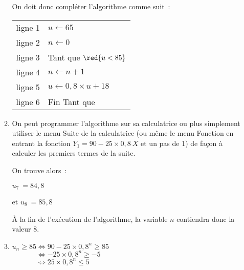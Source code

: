 \begin{corrige}
\begin{enumerate}
\begin{enumerate}[label=\alph*.]
               On doit donc compléter l'algorithme comme suit~:
               \begin{center}
                    \begin{extern}%
                         \begin{tabularx}{0.5\linewidth}{|c|X|}\hline
                              ligne 1&$u \gets 65$\\
                              ligne 2&$n \gets 0$\\
                              ligne 3&Tant que  $\red{u<85}$\\
                              ligne 4&\hspace{1cm}$n \gets n+1$\\
                              ligne 5&\hspace{1cm}$u \gets 0,8 \times u + 18$\\
                              ligne 6&Fin Tant que\\ \hline
                         \end{tabularx}
                    \end{extern}
               \end{center}
               \medskip
               \item
               \par
               On peut programmer l'algorithme sur sa calculatrice ou plus simplement utiliser le menu \og Suite \fg{} de la calculatrice (ou même le menu \og Fonction \fg{} en entrant la fonction $Y_1= 90-25 \times 0,8\hat~X$ et un pas de 1) de façon à calculer les premiers termes de la suite.
               \par
               On trouve alors~:
               \par
               $u_ 7 ~=  84,8$\\
               \par
               et $u_8 ~= 85,8$\\
               \par
               \`A la fin de l'exécution de l'algorithme, la variable $n$ contiendra donc la valeur 8.
               \item
               $u_n \geqslant 85 \Leftrightarrow 90-25\times 0,8^{n} \geqslant 85$\\
               $\phantom{u_n \geqslant 85 } \Leftrightarrow -25\times 0,8^{n} \geqslant -5$\\
               $\phantom{u_n \geqslant 85 } \Leftrightarrow 25\times 0,8^{n} \leqslant 5$\\

\end{enumerate}
\end{enumerate}
\end{corrige}

